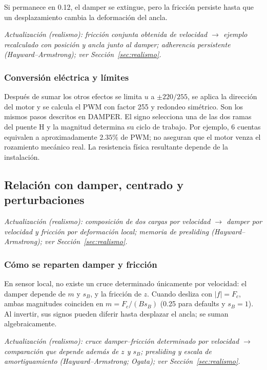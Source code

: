 \documentclass[11pt,a4paper]{article}
\begin{document}
Si permanece en 0.12, el damper se extingue, pero la fricción persiste hasta que un desplazamiento cambia la deformación del ancla.

\textit{Actualización (realismo): fricción conjunta obtenida de velocidad $\rightarrow$ ejemplo recalculado con posición y ancla junto al damper; adherencia persistente (Hayward--Armstrong); ver Sección~\ref{sec:realismo}.}

\subsubsection{Conversión eléctrica y límites}
Después de sumar los otros efectos se limita $u$ a $\pm220/255$, se aplica la dirección del motor y se calcula el PWM con factor 255 y redondeo simétrico. Son los mismos pasos descritos en DAMPER. El signo selecciona una de las dos ramas del puente H y la magnitud determina su ciclo de trabajo. Por ejemplo, 6 cuentas equivalen a aproximadamente $2.35\%$ de PWM; no aseguran que el motor venza el rozamiento mecánico real. La resistencia física resultante depende de la instalación.

\subsection{Relación con damper, centrado y perturbaciones}

\textit{Actualización (realismo): composición de dos cargas por velocidad $\rightarrow$ damper por velocidad y fricción por deformación local; memoria de presliding (Hayward--Armstrong); ver Sección~\ref{sec:realismo}.}

\subsubsection{Cómo se reparten damper y fricción}
En sensor local, no existe un cruce determinado únicamente por velocidad: el damper depende de $m$ y $s_B$, y la fricción de $z$. Cuando desliza con $|f|=F_c$, ambas magnitudes coinciden en $m=F_c/(Bs_B)$ (0.25 para defaults y $s_B=1$). Al invertir, sus signos pueden diferir hasta desplazar el ancla; se suman algebraicamente.

\textit{Actualización (realismo): cruce damper--fricción determinado por velocidad $\rightarrow$ comparación que depende además de $z$ y $s_B$; presliding y escala de amortiguamiento (Hayward--Armstrong; Ogata); ver Sección~\ref{sec:realismo}.}
\end{document}
